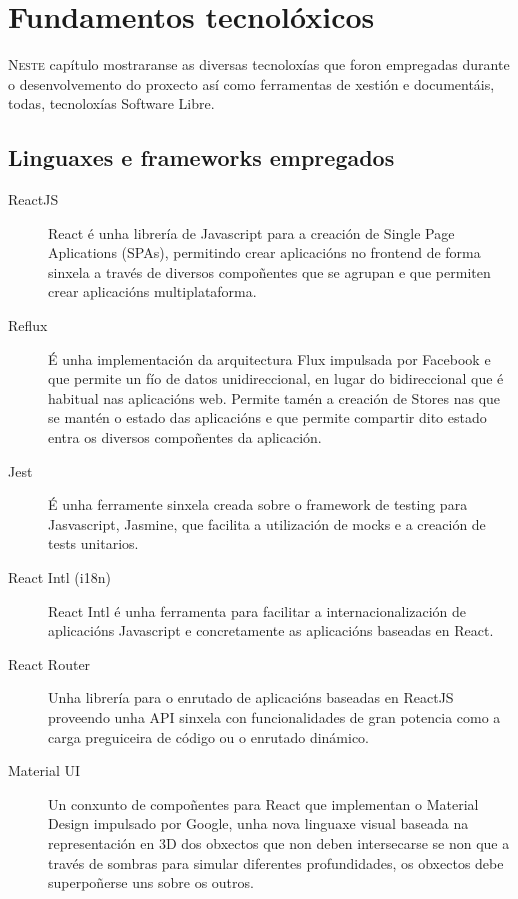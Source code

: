 \chapter{Fundamentos tecnolóxicos}
\minitoc


  \lettrine{N}{este} capítulo mostraranse as diversas tecnoloxías que foron empregadas 
durante o desenvolvemento do proxecto así como ferramentas de xestión e documentáis, 
todas, tecnoloxías Software Libre.

  \section{Linguaxes e frameworks empregados}


  \begin{description}
   \item [ReactJS] React é unha librería de Javascript para a creación de Single Page 
Aplications (SPAs), permitindo crear aplicacións no frontend de forma sinxela a través de 
diversos compoñentes que se agrupan e que permiten crear aplicacións multiplataforma.

   \item [Reflux] É unha implementación da arquitectura Flux impulsada por Facebook e que 
permite un fío de datos unidireccional, en lugar do bidireccional que é habitual nas 
aplicacións web.
    Permite tamén a creación de Stores nas que se mantén o estado das aplicacións e que 
permite compartir dito estado entra os diversos compoñentes da aplicación.

   \item [Jest] É unha ferramente sinxela creada sobre o framework de testing 
para Jasvascript, Jasmine, que facilita a utilización de mocks e a creación de 
tests unitarios.

   \item [React Intl (i18n)] React Intl é unha ferramenta para facilitar a 
internacionalización de aplicacións Javascript e concretamente as 
aplicacións baseadas en React.

   \item [React Router] Unha librería para o enrutado de aplicacións baseadas en ReactJS 
proveendo unha API sinxela con funcionalidades de gran potencia como a carga preguiceira 
de código ou o enrutado dinámico.

   \item [Material UI] Un conxunto de compoñentes para React que implementan o Material 
Design impulsado por Google, unha nova linguaxe visual baseada na representación en 3D 
dos obxectos que non deben intersecarse se non que a través de sombras para simular 
diferentes profundidades, os obxectos debe superpoñerse uns sobre os outros.
   
  \end{description}

